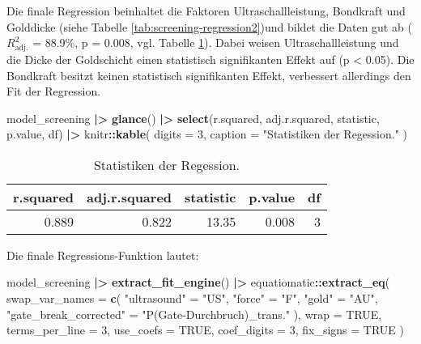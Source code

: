 \documentclass[
  paper=a4,
  ,captions=tableheading
]{scrartcl}
\newenvironment{Shaded}{\begin{snugshade}}{\end{snugshade}}
\newcommand{\DataTypeTok}[1]{\textcolor[rgb]{0.13,0.29,0.53}{#1}}
\newcommand{\DecValTok}[1]{\textcolor[rgb]{0.00,0.00,0.81}{#1}}
\newcommand{\ErrorTok}[1]{\textcolor[rgb]{0.64,0.00,0.00}{\textbf{#1}}}
\newcommand{\KeywordTok}[1]{\textcolor[rgb]{0.13,0.29,0.53}{\textbf{#1}}}
\newcommand{\NormalTok}[1]{#1}
\newcommand{\OperatorTok}[1]{\textcolor[rgb]{0.81,0.36,0.00}{\textbf{#1}}}
\newcommand{\OtherTok}[1]{\textcolor[rgb]{0.56,0.35,0.01}{#1}}
\newcommand{\StringTok}[1]{\textcolor[rgb]{0.31,0.60,0.02}{#1}}
\begin{document}
Die finale Regression beinhaltet die Faktoren Ultraschallleistung, Bondkraft und Golddicke (siehe Tabelle \ref{tab:screening-regression2})und bildet die Daten gut ab (\(R^2_{\text{adj.}}\) = 88.9\%, p = 0.008, vgl. Tabelle \ref{tab:screening-regression2-stats}). Dabei weisen Ultraschallleistung und die Dicke der Goldschicht einen statistisch signifikanten Effekt auf (p \textless{} 0.05). Die Bondkraft besitzt keinen statistisch signifikanten Effekt, verbessert allerdings den Fit der Regression.

\begin{Shaded}
\begin{Highlighting}[]
\NormalTok{model_screening }\OperatorTok{|}\ErrorTok{>}\StringTok{ }
\StringTok{  }\KeywordTok{glance}\NormalTok{() }\OperatorTok{|}\ErrorTok{>}\StringTok{ }
\StringTok{  }\KeywordTok{select}\NormalTok{(r.squared, adj.r.squared, statistic, p.value, df) }\OperatorTok{|}\ErrorTok{>}\StringTok{ }
\StringTok{  }\NormalTok{knitr}\OperatorTok{::}\KeywordTok{kable}\NormalTok{(}
    \DataTypeTok{digits =} \DecValTok{3}\NormalTok{,}
    \DataTypeTok{caption =} \StringTok{"Statistiken der Regession."}
\NormalTok{  )}
\end{Highlighting}
\end{Shaded}

\begin{table}

\caption{\label{tab:screening-regression2-stats}Statistiken der Regession.}
\centering
\begin{tabular}[t]{r|r|r|r|r}
\hline
r.squared & adj.r.squared & statistic & p.value & df\\
\hline
0.889 & 0.822 & 13.35 & 0.008 & 3\\
\hline
\end{tabular}
\end{table}

Die finale Regressions-Funktion lautet:

\begin{Shaded}
\begin{Highlighting}[]
\NormalTok{model_screening }\OperatorTok{|}\ErrorTok{>}\StringTok{ }
\StringTok{  }\KeywordTok{extract_fit_engine}\NormalTok{() }\OperatorTok{|}\ErrorTok{>}\StringTok{ }
\StringTok{  }\NormalTok{equatiomatic}\OperatorTok{::}\KeywordTok{extract_eq}\NormalTok{(}
    \DataTypeTok{swap_var_names =} \KeywordTok{c}\NormalTok{(}
      \StringTok{"ultrasound"}\NormalTok{ =}\StringTok{ "US"}\NormalTok{,}
      \StringTok{"force"}\NormalTok{ =}\StringTok{ "F"}\NormalTok{,}
      \StringTok{"gold"}\NormalTok{ =}\StringTok{ "AU"}\NormalTok{,}
      \StringTok{"gate_break_corrected"}\NormalTok{ =}\StringTok{ "P(Gate-Durchbruch)_trans."}
\NormalTok{    ),}
    \DataTypeTok{wrap =} \OtherTok{TRUE}\NormalTok{,}
    \DataTypeTok{terms_per_line =} \DecValTok{3}\NormalTok{,}
    \DataTypeTok{use_coefs =} \OtherTok{TRUE}\NormalTok{,}
    \DataTypeTok{coef_digits =} \DecValTok{3}\NormalTok{,}
    \DataTypeTok{fix_signs =} \OtherTok{TRUE}
\NormalTok{  )}
\end{Highlighting}
\end{Shaded}
\end{document}
